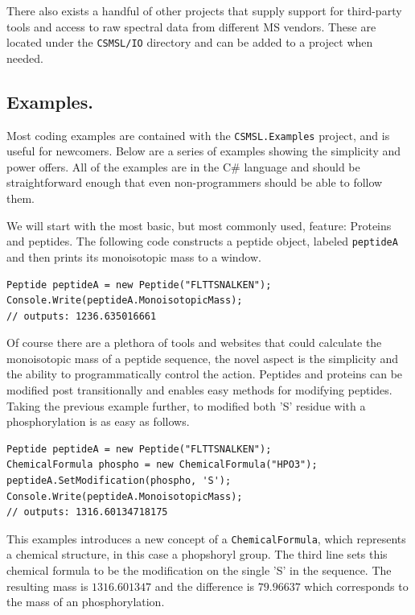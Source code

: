 There also exists a handful of other projects that supply support for third-party tools and access to raw spectral data from different MS vendors. These are located under the \texttt{CSMSL/IO} directory and can be added to a project when needed.

\subsection*{Examples.}
Most coding examples are contained with the \texttt{CSMSL.Examples} project, and is useful for newcomers. Below are a series of examples showing the simplicity and power \csmsl{} offers. All of the examples are in the C\# language and should be straightforward enough that even non-programmers should be able to follow them.

We will start with the most basic, but most commonly used, feature: Proteins and peptides. The following code constructs a peptide object, labeled \texttt{peptideA} and then prints its monoisotopic mass to a window.

\begin{lstlisting}
Peptide peptideA = new Peptide("FLTTSNALKEN");
Console.Write(peptideA.MonoisotopicMass);
// outputs: 1236.635016661
\end{lstlisting}

Of course there are a plethora of tools and websites that could calculate the monoisotopic mass of a peptide sequence, the novel aspect is the simplicity and the ability to programmatically control the action. Peptides and proteins can be modified post transitionally and \csmsl{} enables easy methods for modifying peptides. Taking the previous example further, to modified both 'S' residue with a phosphorylation is as easy as follows.

\begin{lstlisting}
Peptide peptideA = new Peptide("FLTTSNALKEN");
ChemicalFormula phospho = new ChemicalFormula("HPO3");
peptideA.SetModification(phospho, 'S');
Console.Write(peptideA.MonoisotopicMass);
// outputs: 1316.60134718175
\end{lstlisting}

This examples introduces a new concept of a \texttt{ChemicalFormula}, which represents a chemical structure, in this case a phopshoryl group. The third line sets this chemical formula to be the modification on the single 'S' in the sequence. The resulting mass is $1316.601347$ and the difference is $79.96637$ which corresponds to the mass of an phosphorylation.

